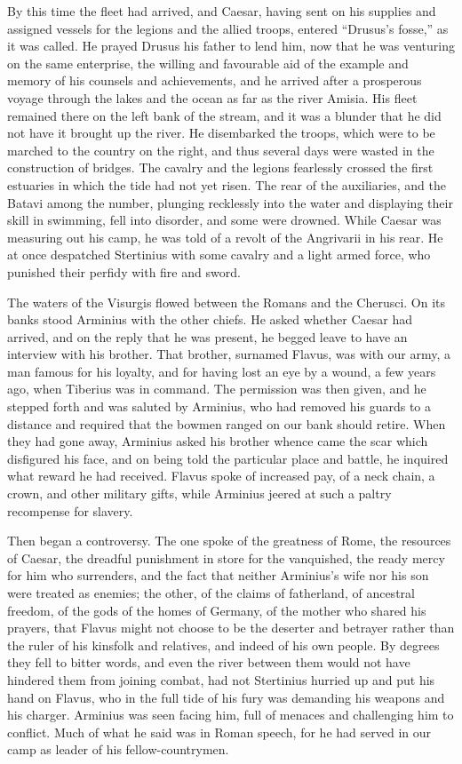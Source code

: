 By this time the fleet had arrived, and Caesar, having sent on his supplies and assigned vessels for the legions and the allied troops, entered ``Drusus's fosse,'' as it was called. He prayed Drusus his father to lend him, now that he was venturing on the same enterprise, the willing and favourable aid of the example and memory of his counsels and achievements, and he arrived after a prosperous voyage through the lakes and the ocean as far as the river Amisia. His fleet remained there on the left bank of the stream, and it was a blunder that he did not have it brought up the river. He disembarked the troops, which were to be marched to the country on the right, and thus several days were wasted in the construction of bridges. The cavalry and the legions fearlessly crossed the first estuaries in which the tide had not yet risen. The rear of the auxiliaries, and the Batavi among the number, plunging recklessly into the water and displaying their skill in swimming, fell into disorder, and some were drowned. While Caesar was measuring out his camp, he was told of a revolt of the Angrivarii in his rear. He at once despatched Stertinius with some cavalry and a light armed force, who punished their perfidy with fire and sword.


The waters of the Visurgis flowed between the Romans and the Cherusci. On its banks stood Arminius with the other chiefs. He asked whether Caesar had arrived, and on the reply that he was present, he begged leave to have an interview with his brother. That brother, surnamed Flavus, was with our army, a man famous for his loyalty, and for having lost an eye by a wound, a few years ago, when Tiberius was in command. The permission was then given, and he stepped forth and was saluted by Arminius, who had removed his guards to a distance and required that the bowmen ranged on our bank should retire. When they had gone away, Arminius asked his brother whence came the scar which disfigured his face, and on being told the particular place and battle, he inquired what reward he had received. Flavus spoke of increased pay, of a neck chain, a crown, and other military gifts, while Arminius jeered at such a paltry recompense for slavery.


Then began a controversy. The one spoke of the greatness of Rome, the resources of Caesar, the dreadful punishment in store for the vanquished, the ready mercy for him who surrenders, and the fact that neither Arminius's wife nor his son were treated as enemies; the other, of the claims of fatherland, of ancestral freedom, of the gods of the homes of Germany, of the mother who shared his prayers, that Flavus might not choose to be the deserter and betrayer rather than the ruler of his kinsfolk and relatives, and indeed of his own people. By degrees they fell to bitter words, and even the river between them would not have hindered them from joining combat, had not Stertinius hurried up and put his hand on Flavus, who in the full tide of his fury was demanding his weapons and his charger. Arminius was seen facing him, full of menaces and challenging him to conflict. Much of what he said was in Roman speech, for he had served in our camp as leader of his fellow-countrymen.

